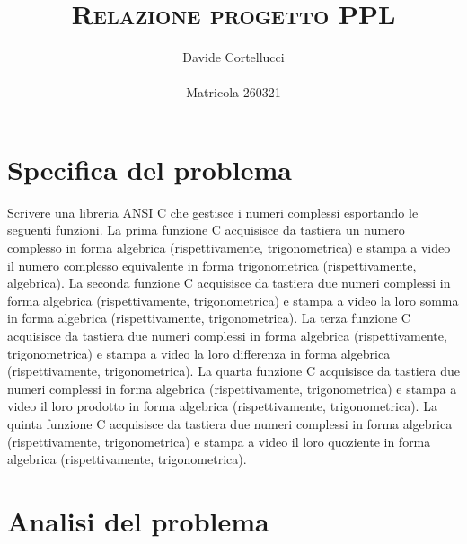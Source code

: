 \documentclass[a4paper,10pt]{article}
\title{ \scshape{Relazione progetto PPL} }
\author{Davide Cortellucci\\\\Matricola 260321}
\date{}
\begin{document}
\maketitle							%
\newpage							%

\section*{ \textbf{Specifica del problema} }			%

Scrivere una libreria ANSI C che gestisce i numeri complessi esportando le seguenti funzioni.
La prima funzione C acquisisce da tastiera un numero complesso in forma algebrica
(rispettivamente, trigonometrica) e stampa a video il numero complesso equivalente
in forma trigonometrica (rispettivamente, algebrica).
La seconda funzione C acquisisce da tastiera due numeri complessi in forma algebrica
(rispettivamente, trigonometrica) e stampa a video la loro somma in forma algebrica
(rispettivamente, trigonometrica).
La terza funzione C acquisisce da tastiera due numeri complessi in forma algebrica
(rispettivamente, trigonometrica) e stampa a video la loro differenza in forma algebrica
(rispettivamente, trigonometrica).
La quarta funzione C acquisisce da tastiera due numeri complessi in forma algebrica
(rispettivamente, trigonometrica) e stampa a video il loro prodotto in forma algebrica
(rispettivamente, trigonometrica).
La quinta funzione C acquisisce da tastiera due numeri complessi in forma algebrica
(rispettivamente, trigonometrica) e stampa a video il loro quoziente in forma algebrica
(rispettivamente, trigonometrica).

\newpage

\section*{ \textbf{Analisi del problema} }
\end{document}
